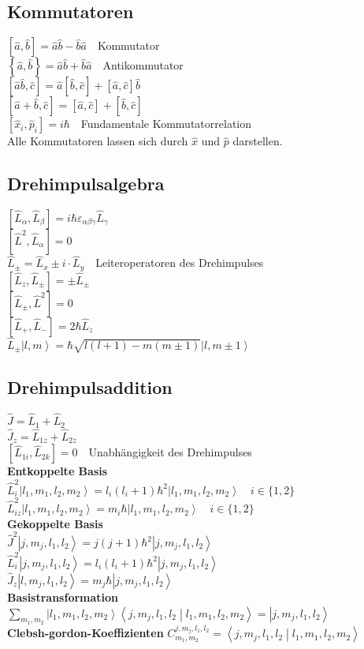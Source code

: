 \documentclass[8pt,a4paper]{extarticle}
\newcommand{\frml}[2]{$#1$~\hfill~#2\\}
\newcommand{\komut}[2]{\left[#1,#2 \right]}
\newcommand{\antikomut}[2]{\left\{#1,#2\right\}}
\newcommand{\ket}[1]{\left|#1\right\rangle}
\newcommand{\oper}[1]{\hat#1}
\newcommand{\braket}[2]                               %
{\left\langle#1 \middle| #2\right\rangle}
\begin{document}
\begin{multicols}{3}
\subsection{Kommutatoren}
\frml{\komut{\oper{a}}{\oper{b}} = \oper{a}\oper{b} - \oper{b}\oper{a}}{Kommutator}
\frml{\antikomut{\oper{a}}{\oper{b}} = \oper{a}\oper{b} + \oper{b}\oper{a}}{Antikommutator}
\frml{\komut{\oper{a}\oper{b}}{\oper{c}}= \oper{a}\komut{\oper{b}}{\oper{c}}+\komut{\oper{a}}{\oper{c}}\oper{b}}{}
\frml{\komut{\oper{a}+\oper{b}}{\oper{c}} = \komut{\oper{a}}{\oper{c}}+\komut{\oper{b}}{\oper{c}}}{}
\frml{\komut{\oper{x}_i}{\oper{p}_i} = i\hbar}{Fundamentale Kommutatorrelation}
Alle Kommutatoren lassen sich durch $\oper{x}$ und $\oper{p}$ darstellen.
\subsection{Drehimpulsalgebra}
\frml{\komut{\oper{L}_\alpha}{\oper{L}_\beta} =  i \hbar \varepsilon_{\alpha\beta\gamma}\oper{L}_\gamma}{}
\frml{\komut{\oper{L}^2}{\oper{L}_\alpha} = 0}{}
\frml{\oper{L}_\pm = \oper{L}_x\pm i\cdot \oper{L}_y}{Leiteroperatoren des Drehimpulses}
\frml{\komut{\oper{L}_z}{\oper{L}_\pm} = \pm\oper{L}_\pm}{}
\frml{\komut{\oper{L}_\pm}{\oper{L}^2}= 0}{}
\frml{\komut{\oper{L}_+}{\oper{L}_-} = 2\hbar \oper{L}_z}{}
\frml{\oper{L}_\pm\ket{l,m} = \hbar\sqrt{l(l+1)-m(m\pm1)}\ket{l,m\pm1}}{}
\subsection{Drehimpulsaddition}
\frml{\oper{J}=\oper{L}_1+\oper{L}_2}{}
\frml{\oper{J}_z = \oper{L}_{1z} +\oper{L}_{2z}}{}
\frml{\komut{\oper{L}_{1i}}{\oper{L}_{2k}} = 0}{Unabh\"angigkeit des Drehimpulses}
\textbf{Entkoppelte Basis}\\
\frml{\oper{L}_i^2\ket{l_1,m_1,l_2,m_2} = l_i(l_i+1)\hbar^2\ket{l_1,m_1,l_2,m_2}}{$i\in\{1,2\}$}
\frml{\oper{L}_{iz}^2\ket{l_1,m_1,l_2,m_2} = m_i\hbar\ket{l_1,m_1,l_2,m_2}}{$i\in\{1,2\}$}
\textbf{Gekoppelte Basis}\\
\frml{\oper{J}^2\ket{j,m_j,l_1,l_2} = j(j+1)\hbar^2\ket{j,m_j,l_1,l_2}}{}
\frml{\oper{L}_i^2\ket{j,m_j,l_1,l_2} = l_i(l_i+1)\hbar^2\ket{j,m_j,l_1,l_2}}{}
\frml{\oper{J}_z\ket{l,m_j,l_1,l_2} = m_j\hbar\ket{j,m_j,l_1,l_2}}{}
\textbf{Basistransformation}\\
\frml{\sum_{m_1,m_2}\ket{l_1,m_1,l_2,m_2}\braket{j,m_j,l_1,l_2}{l_1,m_1,l_2,m_2} = \ket{j,m_j,l_1,l_2}}{}
\textbf{Clebsh-gordon-Koeffizienten}
\frml{C_{m_1,m_2}^{j,m_j,l_1,l_2} = \braket{j,m_j,l_1,l_2}{l_1,m_1,l_2,m_2}}{}

\end{multicols}
\end{document}
